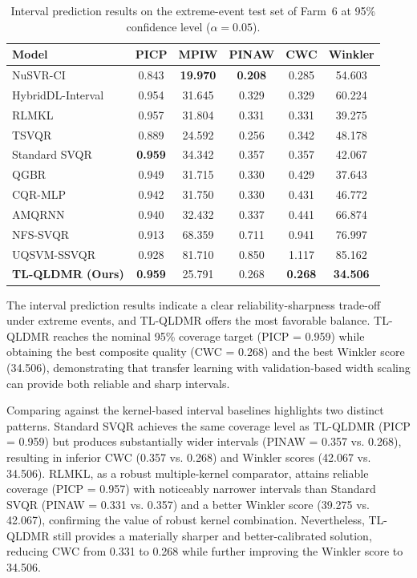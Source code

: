 \begin{table}[ht]
\centering
\caption{Interval prediction results on the extreme-event test set of Farm~6 at 95\% confidence level ($\alpha = 0.05$).}
\setlength{\tabcolsep}{4mm}
\begin{tabular}{lccccc}
\toprule
Model & PICP & MPIW & PINAW & CWC & Winkler \\
\midrule
NuSVR-CI            & 0.843 & \textbf{19.970} & \textbf{0.208} & 0.285 & 54.603 \\
HybridDL-Interval   & 0.954 & 31.645 & 0.329 & 0.329 & 60.224 \\
RLMKL               & 0.957 & 31.804 & 0.331 & 0.331 & 39.275 \\
TSVQR               & 0.889 & 24.592 & 0.256 & 0.342 & 48.178 \\
Standard SVQR       & \textbf{0.959} & 34.342 & 0.357 & 0.357 & 42.067 \\
QGBR                & 0.949 & 31.715 & 0.330 & 0.429 & 37.643 \\
CQR-MLP             & 0.942 & 31.750 & 0.330 & 0.431 & 46.772 \\
AMQRNN              & 0.940 & 32.432 & 0.337 & 0.441 & 66.874 \\
NFS-SVQR            & 0.913 & 68.359 & 0.711 & 0.941 & 76.997 \\
UQSVM-SSVQR         & 0.928 & 81.710 & 0.850 & 1.117 & 85.162 \\
\textbf{TL-QLDMR (Ours)} & \textbf{0.959} & 25.791 & 0.268 & \textbf{0.268} & \textbf{34.506} \\
\bottomrule
\end{tabular}
\label{tab:exp3_results}
\end{table}

The interval prediction results indicate a clear reliability-sharpness trade-off under extreme events, and TL-QLDMR offers the most favorable balance. TL-QLDMR reaches the nominal 95\% coverage target (PICP = 0.959) while obtaining the best composite quality (CWC = 0.268) and the best Winkler score (34.506), demonstrating that transfer learning with validation-based width scaling can provide both reliable and sharp intervals.

Comparing against the kernel-based interval baselines highlights two distinct patterns. Standard SVQR achieves the same coverage level as TL-QLDMR (PICP = 0.959) but produces substantially wider intervals (PINAW = 0.357 vs. 0.268), resulting in inferior CWC (0.357 vs. 0.268) and Winkler scores (42.067 vs. 34.506). RLMKL, as a robust multiple-kernel comparator, attains reliable coverage (PICP = 0.957) with noticeably narrower intervals than Standard SVQR (PINAW = 0.331 vs. 0.357) and a better Winkler score (39.275 vs. 42.067), confirming the value of robust kernel combination. Nevertheless, TL-QLDMR still provides a materially sharper and better-calibrated solution, reducing CWC from 0.331 to 0.268 while further improving the Winkler score to 34.506.

